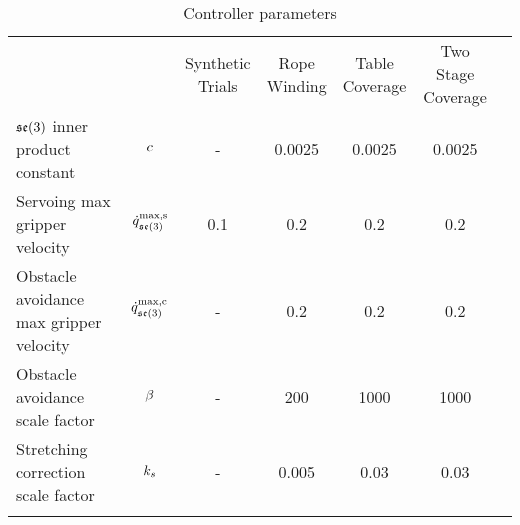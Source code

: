 \begin{table}[h]
\centering
\caption{Controller parameters}
\label{tab:controller_param_table}
\begin{tabular}{lcccccc}
\hline\noalign{\smallskip}
                                                        &                        & \makecell{Synthetic\\Trials} 
                                                                                 & \makecell{Rope\\Winding}
                                                                                 & \makecell{Table\\Coverage}
                                                                                 & \makecell{Two Stage\\Coverage} \\
\noalign{\smallskip}\hline\noalign{\smallskip}
\makecell[l]{$\mathfrak{se}(3)$ inner\\product constant}       & $c$        &   - & 0.0025 & 0.0025 & 0.0025 \\
\noalign{\smallskip}
\makecell[l]{Servoing max\\gripper velocity}            & $\dot{q}^\textrm{max,s}_{\mathfrak{se}(3)}$  & 0.1 &    0.2 &    0.2 &    0.2 \\
\noalign{\smallskip}
\makecell[l]{Obstacle avoidance\\max gripper velocity}  & $\dot{q}^\textrm{max,c}_{\mathfrak{se}(3)}$    &   - &    0.2 &    0.2 &    0.2 \\
\noalign{\smallskip}
\makecell[l]{Obstacle avoidance\\scale factor}          & $\beta$      &   - &    200 &   1000 &   1000 \\
\noalign{\smallskip}
\makecell[l]{Stretching correction\\scale factor}       & $k_s$ &   - &  0.005 &   0.03 &   0.03 \\
\noalign{\smallskip}\hline
\end{tabular}

\end{table}
